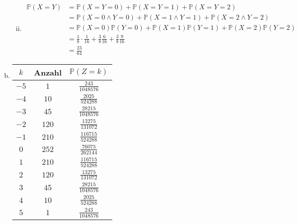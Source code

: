 \documentclass{article}
\renewcommand{\P}{\mathbb{P}}
\begin{document}
\begin{enumerate}[a)]
\begin{enumerate}[(i)]
                \item
                    \begin{align*}
                        \P(X=Y)
                        &=\P(X=Y=0)+\P(X=Y=1)+\P(X=Y=2)\\
                        &=\P(X=0\land Y=0)+\P(X=1\land Y=1)+\P(X=2\land Y=2)\\
                        &=\P(X=0)\P(Y=0)+\P(X=1)\P(Y=1)+\P(X=2)\P(Y=2)\\
                        &=\frac{1}{8}\cdot\frac{1}{16}+\frac{3}{8}\frac{6}{16}+\frac{3}{8}\frac{9}{16}\\
                        &=\frac{23}{64}
                    \end{align*}
            \end{enumerate}
        \item
            \begin{tabular}{c|cc}
                $k$&Anzahl&$\P(Z=k)$\\
                \hline
                $-5$&$1$&$\frac{243}{1048576}$\\
                $-4$&$10$&$\frac{2025}{524288}$\\
                $-3$&$45$&$\frac{28215}{1048576}$\\
                $-2$&$120$&$\frac{13275}{131072}$\\
                $-1$&$210$&$\frac{116715}{524288}$\\
                $0$&$252$&$\frac{76075}{262144}$\\
                $1$&$210$&$\frac{116715}{524288}$\\
                $2$&$120$&$\frac{13275}{131072}$\\
                $3$&$45$&$\frac{28215}{1048576}$\\
                $4$&$10$&$\frac{2025}{524288}$\\
                $5$&$1$&$\frac{243}{1048576}$\\
            \end{tabular}
    \end{enumerate}
\end{document}
